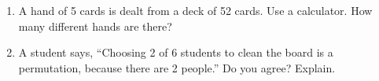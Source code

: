 \documentclass[11pt]{article}
\begin{document}
\begin{enumerate}
\item A hand of 5 cards is dealt from a deck of 52 cards. Use a calculator. How many different hands are there?

\work{3em}

\item A student says, ``Choosing 2 of 6 students to clean the board is a permutation, because there are 2 people.''
Do you agree? Explain.


\end{enumerate}
\end{document}
